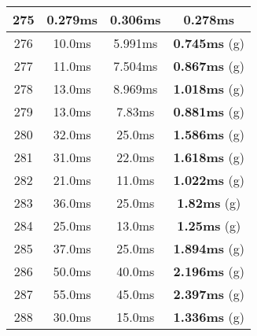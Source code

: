 \begin{table}[H]
\begin{minipage}{5cm}
{\begin{tabular}{|c|c|c|c|}
\hline
275 & 0.279ms & 0.306ms & \textbf{0.278ms} \\
\hline
276 & 10.0ms & 5.991ms & \textbf{0.745ms} (g) \\
\hline
277 & 11.0ms & 7.504ms & \textbf{0.867ms} (g) \\
\hline
278 & 13.0ms & 8.969ms & \textbf{1.018ms} (g) \\
\hline
279 & 13.0ms & 7.83ms & \textbf{0.881ms} (g) \\
\hline
280 & 32.0ms & 25.0ms & \textbf{1.586ms} (g) \\
\hline
281 & 31.0ms & 22.0ms & \textbf{1.618ms} (g) \\
\hline
282 & 21.0ms & 11.0ms & \textbf{1.022ms} (g) \\
\hline
283 & 36.0ms & 25.0ms & \textbf{1.82ms} (g) \\
\hline
284 & 25.0ms & 13.0ms & \textbf{1.25ms} (g) \\
\hline
285 & 37.0ms & 25.0ms & \textbf{1.894ms} (g) \\
\hline
286 & 50.0ms & 40.0ms & \textbf{2.196ms} (g) \\
\hline
287 & 55.0ms & 45.0ms & \textbf{2.397ms} (g) \\
\hline
288 & 30.0ms & 15.0ms & \textbf{1.336ms} (g) \\
\hline
\end{tabular}
}
\end{minipage}
\begin{minipage}{5cm} 
\end{minipage}
\end{table}
